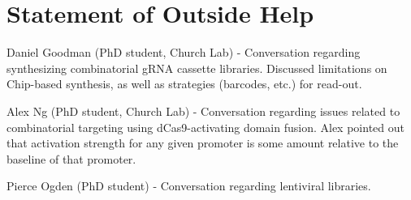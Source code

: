 \documentclass[10pt]{article}
\begin{document}



\pagebreak




\section*{Statement of Outside Help}

\noindent Daniel Goodman (PhD student, Church Lab) - Conversation regarding synthesizing combinatorial gRNA cassette libraries. Discussed limitations on Chip-based synthesis, as well as strategies (barcodes, etc.) for read-out.
\newline

\noindent Alex Ng (PhD student, Church Lab) - Conversation regarding issues related to combinatorial targeting using dCas9-activating domain fusion. Alex pointed out that activation strength for any given promoter is some amount relative to the baseline of that promoter.
\newline

\noindent Pierce Ogden (PhD student) - Conversation regarding lentiviral libraries.
\end{document}
